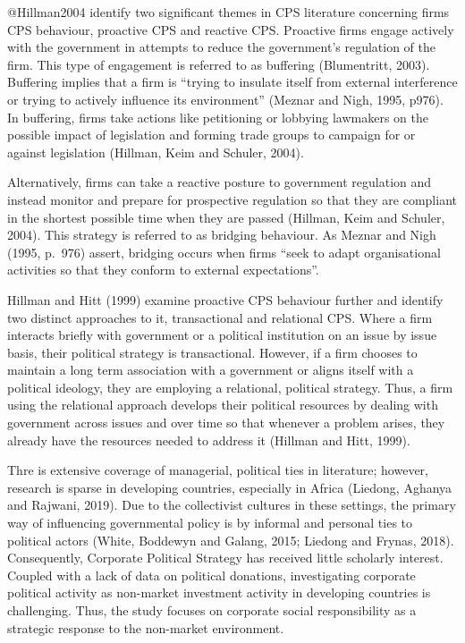 \documentclass[
]{mitthesis}
\begin{document}
@Hillman2004 identify two significant themes in CPS literature concerning firms CPS behaviour, proactive CPS and reactive CPS. Proactive firms engage actively with the government in attempts to reduce the government's regulation of the firm. This type of engagement is referred to as buffering (Blumentritt, 2003). Buffering implies that a firm is ``trying to insulate itself from external interference or trying to actively influence its environment'' (Meznar and Nigh, 1995, p976). In buffering, firms take actions like petitioning or lobbying lawmakers on the possible impact of legislation and forming trade groups to campaign for or against legislation (Hillman, Keim and Schuler, 2004).

Alternatively, firms can take a reactive posture to government regulation and instead monitor and prepare for prospective regulation so that they are compliant in the shortest possible time when they are passed (Hillman, Keim and Schuler, 2004). This strategy is referred to as bridging behaviour. As Meznar and Nigh (1995, p.~976) assert, bridging occurs when firms ``seek to adapt organisational activities so that they conform to external expectations''.

Hillman and Hitt (1999) examine proactive CPS behaviour further and identify two distinct approaches to it, transactional and relational CPS. Where a firm interacts briefly with government or a political institution on an issue by issue basis, their political strategy is transactional. However, if a firm chooses to maintain a long term association with a government or aligns itself with a political ideology, they are employing a relational, political strategy. Thus, a firm using the relational approach develops their political resources by dealing with government across issues and over time so that whenever a problem arises, they already have the resources needed to address it (Hillman and Hitt, 1999).

Thre is extensive coverage of managerial, political ties in literature; however, research is sparse in developing countries, especially in Africa (Liedong, Aghanya and Rajwani, 2019). Due to the collectivist cultures in these settings, the primary way of influencing governmental policy is by informal and personal ties to political actors (White, Boddewyn and Galang, 2015; Liedong and Frynas, 2018). Consequently, Corporate Political Strategy has received little scholarly interest. Coupled with a lack of data on political donations, investigating corporate political activity as non-market investment activity in developing countries is challenging. Thus, the study focuses on corporate social responsibility as a strategic response to the non-market environment.
\end{document}
